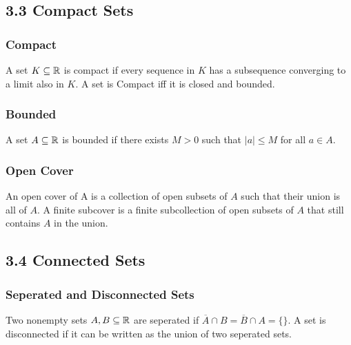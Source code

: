 \documentclass{article}
\begin{document}
\subsection*{3.3 Compact Sets}
\subsubsection*{Compact}
A set $K \subseteq \protect\mathbb{R}$ is compact if every sequence in $K$ has a subsequence converging to a limit also in $K$. A set is Compact iff it is closed and bounded.

\subsubsection*{Bounded}
A set $A \subseteq \protect\mathbb{R}$ is bounded if there exists $M > 0$ such that $|a| \le M$ for all $a \in A$.

\subsubsection*{Open Cover}
An open cover of A is a collection of open subsets of $A$ such that their union is all of $A$. A finite subcover is a finite subcollection of open subsets of $A$ that still contains $A$ in the union.

\subsection*{3.4 Connected Sets}
\subsubsection*{Seperated and Disconnected Sets}
Two nonempty sets $A, B \subseteq \protect\mathbb{R}$ are seperated if $\overline{A}\cap B = \overline{B} \cap A = \{\}$. A set is disconnected if it can be written as the union of two seperated sets.
\end{document}
